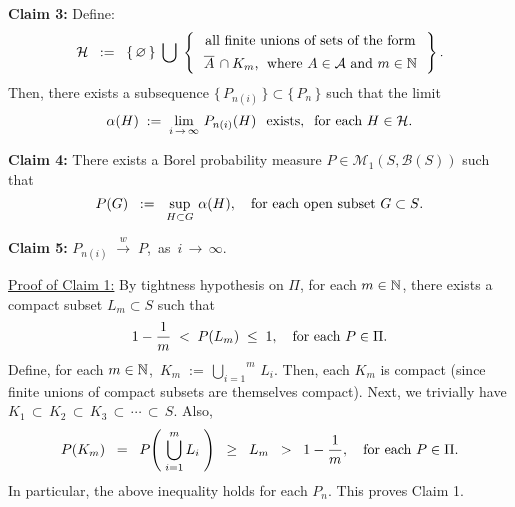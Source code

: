 \vskip 0.5cm
\begin{center}
\begin{minipage}{6.5in}
\textbf{Claim 3:}\quad
Define:
\begin{equation*}
\mathcal{H}
\;\; := \;\;
\left\{\,\varemptyset\,\right\}
\;\bigcup\;
\left\{\,
\begin{array}{c}
\textnormal{all finite unions of sets of the form}
\\
\textnormal{$\overline{A}\,\overset{{\color{white}1}}{\cap}K_{m}$, \;where $A \in \mathcal{A}$ and $m \in \N$}
\end{array}
\,\right\}.
\end{equation*}
Then, there exists a subsequence $\{\,P_{n(i)}\,\} \subset \{\,P_{n}\,\}$ such that the limit
\begin{equation*}
\alpha(H) \; := \;
\lim_{i\,\rightarrow\,\infty}\,P_{n(i)}(H) \;\;\,\textnormal{exists},
\;\;
\textnormal{for each $H \in \mathcal{H}$}.
\end{equation*}
\end{minipage}
\end{center}

\vskip 0.5cm
\begin{center}
\begin{minipage}{6.5in}
\textbf{Claim 4:}\quad
There exists a Borel probability measure $P \in \mathcal{M}_{1}(S,\mathcal{B}(S))$ such that
\begin{equation*}
P(G)
\;\; := \;\;
\sup_{H\subset G}\,\alpha(H),
\quad
\textnormal{for each open subset $G \subset S$}.
\end{equation*}
\end{minipage}
\end{center}

\vskip 0.5cm
\begin{center}
\begin{minipage}{6.5in}
\textbf{Claim 5:}\quad
$P_{n(i)} \;\overset{w}{\longrightarrow}\; P$,\,
as \,$i\,\longrightarrow\,\infty$.
\end{minipage}
\end{center}

\vskip 0.5cm
\noindent
\underline{Proof of Claim 1:}\quad
By tightness hypothesis on $\Pi$,
for each $m \in \mathbb{N}$,
there exists a compact subset $L_{m} \subset S$ such that
\begin{equation*}
1 - \dfrac{1}{m} \; < \; P(L_{m}) \; \leq \; 1,
\quad
\textnormal{for each $P \in \Pi$}.
\end{equation*}
Define, for each $m \in \mathbb{N}$,
\,$K_{m} \; := \, \overset{m}{\underset{i=1}{\bigcup}}\,L_{i}$.
Then, each $K_{m}$ is compact (since finite unions of compact subsets are themselves compact).
Next, we trivially have\;
$K_{1} \,\subset\, K_{2} \,\subset\, K_{3} \,\subset\, \cdots \,\subset\, S$.
Also,
\begin{equation*}
P(K_{m})
\;\;=\;\; P\!\left(\;\bigcup_{i=1}^{m}L_{i}\;\right)
\;\;\geq\;\; L_{m}
\;\; > \;\; 1 - \dfrac{1}{m},
\quad
\textnormal{for each $P \in \Pi$}.
\end{equation*}
In particular, the above inequality holds for each $P_{n}$. This proves Claim 1.


